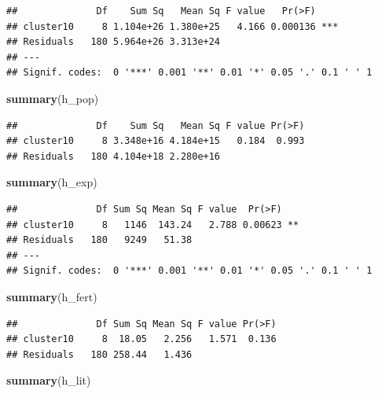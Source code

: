 \documentclass[]{article}
\newenvironment{Shaded}{\begin{snugshade}}{\end{snugshade}}
\newcommand{\KeywordTok}[1]{\textcolor[rgb]{0.13,0.29,0.53}{\textbf{#1}}}
\newcommand{\NormalTok}[1]{#1}
\begin{document}
\begin{verbatim}
##              Df    Sum Sq   Mean Sq F value   Pr(>F)    
## cluster10     8 1.104e+26 1.380e+25   4.166 0.000136 ***
## Residuals   180 5.964e+26 3.313e+24                     
## ---
## Signif. codes:  0 '***' 0.001 '**' 0.01 '*' 0.05 '.' 0.1 ' ' 1
\end{verbatim}

\begin{Shaded}
\begin{Highlighting}[]
\KeywordTok{summary}\NormalTok{(h_pop)}
\end{Highlighting}
\end{Shaded}

\begin{verbatim}
##              Df    Sum Sq   Mean Sq F value Pr(>F)
## cluster10     8 3.348e+16 4.184e+15   0.184  0.993
## Residuals   180 4.104e+18 2.280e+16
\end{verbatim}

\begin{Shaded}
\begin{Highlighting}[]
\KeywordTok{summary}\NormalTok{(h_exp)}
\end{Highlighting}
\end{Shaded}

\begin{verbatim}
##              Df Sum Sq Mean Sq F value  Pr(>F)   
## cluster10     8   1146  143.24   2.788 0.00623 **
## Residuals   180   9249   51.38                   
## ---
## Signif. codes:  0 '***' 0.001 '**' 0.01 '*' 0.05 '.' 0.1 ' ' 1
\end{verbatim}

\begin{Shaded}
\begin{Highlighting}[]
\KeywordTok{summary}\NormalTok{(h_fert)}
\end{Highlighting}
\end{Shaded}

\begin{verbatim}
##              Df Sum Sq Mean Sq F value Pr(>F)
## cluster10     8  18.05   2.256   1.571  0.136
## Residuals   180 258.44   1.436
\end{verbatim}

\begin{Shaded}
\begin{Highlighting}[]
\KeywordTok{summary}\NormalTok{(h_lit)}
\end{Highlighting}
\end{Shaded}
\end{document}
